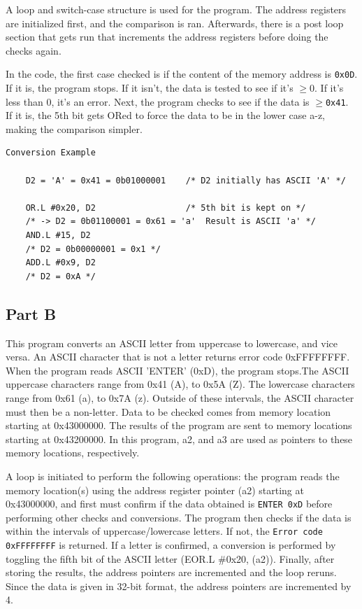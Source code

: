 \documentclass[12pt]{article}
\begin{document}
    A loop and switch-case structure is used for the program. The address registers are initialized first, and the comparison is ran. Afterwards, there is a post loop section that gets run that increments the address registers before doing the checks again.
    
    In the code, the first case checked is if the content of the memory address is \Verb/0x0D/. If it is, the program stops. If it isn't, the data is tested to see if it's $\geq0$. If it's less than 0, it's an error. Next, the program checks to see if the data is $\geq$\Verb/0x41/. If it is, the 5th bit gets ORed to force the data to be in the lower case a-z, making the comparison simpler.

    
    \begin{lstlisting}[language={[Motorola68k]Assembler}, style={mystyle}]
    Conversion Example
    
    D2 = 'A' = 0x41 = 0b01000001    /* D2 initially has ASCII 'A' */

    OR.L #0x20, D2                  /* 5th bit is kept on */
    /* -> D2 = 0b01100001 = 0x61 = 'a'  Result is ASCII 'a' */
    AND.L #15, D2
    /* D2 = 0b00000001 = 0x1 */
    ADD.L #0x9, D2
    /* D2 = 0xA */
    \end{lstlisting}

\subsection{Part B}
    This program converts an ASCII letter from uppercase to lowercase, and vice versa. An ASCII character that is not a letter returns error code 0xFFFFFFFF. When the program reads ASCII 'ENTER' (0xD), the program stops.The ASCII uppercase characters range from 0x41 (A), to 0x5A (Z). The lowercase characters range from 0x61 (a), to 0x7A (z). Outside of these intervals, the ASCII character must then be a non-letter. Data to be checked comes from memory location starting at 0x43000000. The results of the program are sent to memory locations starting at 0x43200000. In this program, a2, and a3 are used as pointers to these memory locations, respectively.

    A loop is initiated to perform the following operations: the program reads the memory location(s) using the address register pointer (a2) starting at 0x43000000, and first must confirm if the data obtained is \Verb#ENTER 0xD# before performing other checks and conversions. The program then checks if the data is within the intervals of uppercase/lowercase letters. If not, the \Verb#Error code 0xFFFFFFFF# is returned. If a letter is confirmed, a conversion is performed by toggling the fifth bit of the ASCII letter (EOR.L \#0x20, (a2)). Finally, after storing the results, the address pointers are incremented and the loop reruns. Since the data is given in 32-bit format, the address pointers are incremented by 4.
    
\end{document}
